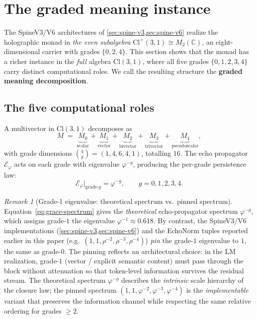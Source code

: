 \documentclass[11pt,a4paper]{article}
\theoremstyle{plain}
\theoremstyle{definition}
\theoremstyle{remark}
\newtheorem{remark}[theorem]{Remark}
\numberwithin{equation}{section}
\providecommand{\Cl}{\mathrm{Cl}}
\providecommand{\C}{\mathbb{C}}
\providecommand{\vp}{\varphi}
\providecommand{\Ephi}{\mathcal{E}_{\vp}}
\begin{document}
\section{The graded meaning instance}
\label{sec:graded-meaning}

The SpineV3/V6 architectures of \cref{sec:spine-v3,sec:spine-v6}
realize the holographic monad in \emph{the even subalgebra}
$\Cl^+(3,1) \cong M_2(\C)$, an eight-dimensional carrier with grades
$\{0, 2, 4\}$.  This section shows that the monad has a richer
instance in the \emph{full} algebra $\Cl(3,1)$, where all five
grades $\{0, 1, 2, 3, 4\}$ carry distinct computational roles.  We
call the resulting structure the \textbf{graded meaning
decomposition}.

\subsection{The five computational roles}

A multivector in $\Cl(3,1)$ decomposes as
\begin{equation}\label{eq:graded-state}
  M \;=\;
  \underbrace{M_0}_{\text{scalar}} +
  \underbrace{M_1}_{\text{vector}} +
  \underbrace{M_2}_{\text{bivector}} +
  \underbrace{M_3}_{\text{trivector}} +
  \underbrace{M_4}_{\text{pseudoscalar}},
\end{equation}
with grade dimensions $\binom{4}{g} = (1, 4, 6, 4, 1)$, totalling
$16$.  The echo propagator $\Ephi$ acts on each grade with eigenvalue
$\vp^{-g}$, producing the per-grade persistence law:
\begin{equation}\label{eq:grace-spectrum}
  \Ephi\big|_{\text{grade-}g} = \vp^{-g},
  \qquad g = 0, 1, 2, 3, 4.
\end{equation}

\begin{remark}[Grade-1 eigenvalue: theoretical spectrum vs.\ pinned spectrum]
\label{rmk:grade1-discrepancy}
Equation~\eqref{eq:grace-spectrum} gives the \emph{theoretical}
echo-propagator spectrum $\vp^{-g}$, which assigns grade-$1$ the
eigenvalue $\vp^{-1} \approx 0.618$.  By contrast, the SpineV3/V6
implementations (\cref{sec:spine-v3,sec:spine-v6}) and the
EchoNorm tuples reported earlier in this paper (e.g.\
$(1, 1, \rho^{-2}, \rho^{-3}, \rho^{-4})$) \emph{pin} the grade-$1$
eigenvalue to $1$, the same as grade-$0$.  The pinning reflects an
architectural choice: in the LM realization, grade-$1$ (vector /
explicit semantic content) must pass through the block without
attenuation so that token-level information survives the residual
stream.  The theoretical spectrum $\vp^{-g}$ describes the
\emph{intrinsic} scale hierarchy of the closure law; the pinned
spectrum $(1, 1, \vp^{-2}, \vp^{-3}, \vp^{-4})$ is the
\emph{implementable} variant that preserves the information channel
while respecting the same relative ordering for grades $\ge 2$.
\end{remark}
\end{document}
